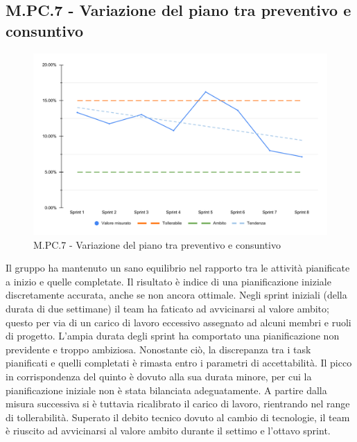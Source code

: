 \subsection{M.PC.7 - Variazione del piano tra preventivo e consuntivo}
\begin{figure}[H]
    \centering
    \includegraphics[width=\textwidth]{assets/variazione_task_completati.pdf}
    \caption{M.PC.7 - Variazione del piano tra preventivo e consuntivo}
\end{figure}

\par Il gruppo ha mantenuto un sano equilibrio nel rapporto tra le attività pianificate a inizio  e quelle completate. Il risultato è indice di una pianificazione iniziale discretamente accurata, anche se non ancora ottimale. Negli sprint iniziali (della durata di due settimane) il team ha faticato ad avvicinarsi al valore ambito; questo per via di un carico di lavoro eccessivo assegnato ad alcuni membri e ruoli di progetto. L’ampia durata degli sprint ha comportato una pianificazione non previdente e troppo ambiziosa. Nonostante ciò, la discrepanza tra i task pianificati e quelli completati è rimasta entro i parametri di accettabilità. Il picco in corrispondenza del quinto  è dovuto alla sua durata minore, per cui la pianificazione iniziale non è stata bilanciata adeguatamente. A partire dalla misura successiva si è tuttavia ricalibrato il carico di lavoro, rientrando nel range di tollerabilità. Superato il debito tecnico dovuto al cambio di tecnologie, il team è riuscito ad avvicinarsi al valore ambito durante il settimo e l'ottavo sprint.
